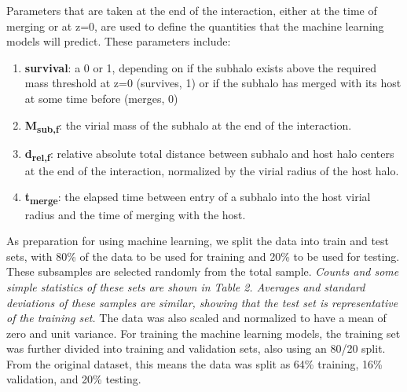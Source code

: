 \documentclass[fleqn,usenatbib]{mnras}
\begin{document}
    Parameters that are taken at the end of the interaction, either at the time of merging or at z=0, are used to define the quantities that the machine learning models will predict. These parameters include:
    
\renewcommand{\theenumi}{\arabic{enumi}}
    \begin{enumerate}
        \item \textbf{survival}: a 0 or 1, depending on if the subhalo exists above the required mass threshold at z=0 (survives, 1) or if the subhalo has merged with its host at some time before (merges, 0)
        \item \textbf{M\textsubscript{sub,f}}: the virial mass of the subhalo at the end of the interaction.
        \item \textbf{d\textsubscript{rel,f}}: relative absolute total distance between subhalo and host halo centers at the end of the interaction, normalized by the virial radius of the host halo.
        \item \textbf{t\textsubscript{merge}}: the elapsed time between entry of a subhalo into the host virial radius and the time of merging with the host.
    \end{enumerate}
\par
    As preparation for using machine learning, we split the data into train and test sets, with 80\% of the data to be used for training and 20\% to be used for testing. These subsamples are selected randomly from the total sample. \textit{Counts and some simple statistics of these sets are shown in Table 2. Averages and standard deviations of these samples are similar, showing that the test set is representative of the training set.} The data was also scaled and normalized to have a mean of zero and unit variance. For training the machine learning models, the training set was further divided into training and validation sets, also using an 80/20 split. From the original dataset, this means the data was split as 64\% training, 16\% validation, and 20\% testing.
\end{document}
